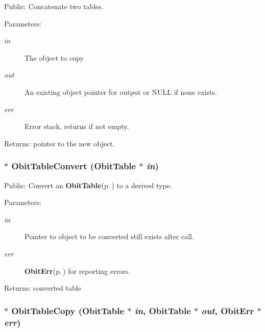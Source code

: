 Public: Concatenate two tables. 

\begin{Desc}
\item[Parameters:]
\begin{description}
\item[{\em in}]The object to copy \item[{\em out}]An existing object pointer for output or NULL if none exists. \item[{\em err}]Error stack, returns if not empty. \end{description}
\end{Desc}
\begin{Desc}
\item[Returns:]pointer to the new object. \end{Desc}
\subsubsection{$\ast$ Obit\-Table\-Convert ({\bf Obit\-Table} $\ast$ {\em in})}\label{ObitTable_8c_a29}


Public: Convert an {\bf Obit\-Table}{\rm (p.\,\pageref{structObitTable})} to a derived type. 

\begin{Desc}
\item[Parameters:]
\begin{description}
\item[{\em in}]Pointer to object to be converted still exists after call. \item[{\em err}]{\bf Obit\-Err}{\rm (p.\,\pageref{structObitErr})} for reporting errors. \end{description}
\end{Desc}
\begin{Desc}
\item[Returns:]converted table \end{Desc}
\subsubsection{$\ast$ Obit\-Table\-Copy ({\bf Obit\-Table} $\ast$ {\em in}, {\bf Obit\-Table} $\ast$ {\em out}, {\bf Obit\-Err} $\ast$ {\em err})}\label{ObitTable_8c_a19}



